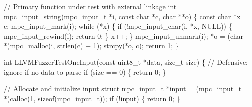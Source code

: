 \documentclass[
  a4paper,
]{scrreprt}
\newenvironment{Shaded}{\begin{snugshade}}{\end{snugshade}}
\newcommand{\CommentTok}[1]{\textcolor[rgb]{0.41,0.41,0.41}{#1}}
\newcommand{\ControlFlowTok}[1]{\textcolor[rgb]{0.85,0.12,0.09}{#1}}
\newcommand{\DataTypeTok}[1]{\textcolor[rgb]{0.47,0.16,0.63}{#1}}
\newcommand{\DecValTok}[1]{\textcolor[rgb]{0.47,0.16,0.63}{#1}}
\newcommand{\KeywordTok}[1]{\textcolor[rgb]{0.85,0.12,0.09}{#1}}
\newcommand{\NormalTok}[1]{\textcolor[rgb]{0.33,0.33,0.33}{#1}}
\newcommand{\OperatorTok}[1]{\textcolor[rgb]{0.00,0.46,0.62}{#1}}
\theoremstyle{definition}
\theoremstyle{remark}
\begin{document}
\begin{Shaded}
\begin{Highlighting}[numbers=left,,]
\CommentTok{// Primary function under test with external linkage}
\DataTypeTok{int}\NormalTok{ mpc\_input\_string}\OperatorTok{(}\NormalTok{mpc\_input\_t }\OperatorTok{*}\NormalTok{i}\OperatorTok{,} \DataTypeTok{const} \DataTypeTok{char} \OperatorTok{*}\NormalTok{c}\OperatorTok{,} \DataTypeTok{char} \OperatorTok{**}\NormalTok{o}\OperatorTok{)} \OperatorTok{\{}
  \DataTypeTok{const} \DataTypeTok{char} \OperatorTok{*}\NormalTok{x }\OperatorTok{=}\NormalTok{ c}\OperatorTok{;}
\NormalTok{  mpc\_input\_mark}\OperatorTok{(}\NormalTok{i}\OperatorTok{);}
  \ControlFlowTok{while} \OperatorTok{(*}\NormalTok{x}\OperatorTok{)} \OperatorTok{\{}
    \ControlFlowTok{if} \OperatorTok{(!}\NormalTok{mpc\_input\_char}\OperatorTok{(}\NormalTok{i}\OperatorTok{,} \OperatorTok{*}\NormalTok{x}\OperatorTok{,}\NormalTok{ NULL}\OperatorTok{))} \OperatorTok{\{}
\NormalTok{      mpc\_input\_rewind}\OperatorTok{(}\NormalTok{i}\OperatorTok{);}
      \ControlFlowTok{return} \DecValTok{0}\OperatorTok{;}
    \OperatorTok{\}}
\NormalTok{    x}\OperatorTok{++;}
  \OperatorTok{\}}
\NormalTok{  mpc\_input\_unmark}\OperatorTok{(}\NormalTok{i}\OperatorTok{);}
  \OperatorTok{*}\NormalTok{o }\OperatorTok{=} \OperatorTok{(}\DataTypeTok{char} \OperatorTok{*)}\NormalTok{mpc\_malloc}\OperatorTok{(}\NormalTok{i}\OperatorTok{,}\NormalTok{ strlen}\OperatorTok{(}\NormalTok{c}\OperatorTok{)} \OperatorTok{+} \DecValTok{1}\OperatorTok{);}
\NormalTok{  strcpy}\OperatorTok{(*}\NormalTok{o}\OperatorTok{,}\NormalTok{ c}\OperatorTok{);}
  \ControlFlowTok{return} \DecValTok{1}\OperatorTok{;}
\OperatorTok{\}}

\DataTypeTok{int}\NormalTok{ LLVMFuzzerTestOneInput}\OperatorTok{(}\DataTypeTok{const} \DataTypeTok{uint8\_t} \OperatorTok{*}\NormalTok{data}\OperatorTok{,} \DataTypeTok{size\_t}\NormalTok{ size}\OperatorTok{)} \OperatorTok{\{}
  \CommentTok{// Defensive: ignore if no data to parse}
  \ControlFlowTok{if} \OperatorTok{(}\NormalTok{size }\OperatorTok{==} \DecValTok{0}\OperatorTok{)} \OperatorTok{\{} \ControlFlowTok{return} \DecValTok{0}\OperatorTok{;} \OperatorTok{\}}

  \CommentTok{// Allocate and initialize input struct}
\NormalTok{  mpc\_input\_t }\OperatorTok{*}\NormalTok{input }\OperatorTok{=} \OperatorTok{(}\NormalTok{mpc\_input\_t }\OperatorTok{*)}\NormalTok{calloc}\OperatorTok{(}\DecValTok{1}\OperatorTok{,} \KeywordTok{sizeof}\OperatorTok{(}\NormalTok{mpc\_input\_t}\OperatorTok{));}
  \ControlFlowTok{if} \OperatorTok{(!}\NormalTok{input}\OperatorTok{)} \OperatorTok{\{} \ControlFlowTok{return} \DecValTok{0}\OperatorTok{;} \OperatorTok{\}}


\end{Highlighting}
\end{Shaded}
\end{document}

